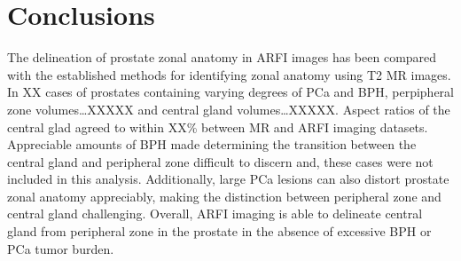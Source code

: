 \section{Conclusions}
The delineation of prostate zonal anatomy in ARFI images has been compared with
the established methods for identifying zonal anatomy using T2 MR images.  In
XX cases of prostates containing varying degrees of PCa and BPH, perpipheral
zone volumes\ldots XXXXX and central gland volumes\ldots XXXXX.  Aspect ratios
of the central glad agreed to within XX\% between MR and ARFI imaging datasets.
Appreciable amounts of BPH made determining the transition between the central
gland and peripheral zone difficult to discern and, these cases were not
included in this analysis.  Additionally, large PCa lesions can also distort
prostate zonal anatomy appreciably, making the distinction between peripheral
zone and central gland challenging.  Overall, ARFI imaging is able to delineate
central gland from peripheral zone in the prostate in the absence of excessive
BPH or PCa tumor burden.
